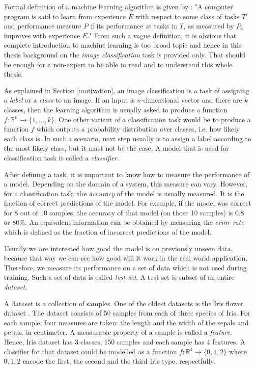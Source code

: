 Formal definition of a machine learning algorithm is given by \cite{Mitchell:1997:ML:541177}: "A computer program is said to learn from experience $E$ with respect to some class of tasks $T$ and performance measure $P$ if its performance at tasks in $T$, as measured by $P$, improves with experience $E$." 
From such a vague definition, it is obvious that complete introduction to machine learning is too broad topic and hence in this thesis background on the \textit{image classification} task is provided only. That should be enough for a non-expert to be able to read and to understand this whole thesis.

As explained in Section \ref{motivation}, an image classification is a task of assigning a \textit{label} or a \textit{class} to an image. If an input is $n$-dimensional vector and there are $k$ classes, then the learning algorithm is usually asked to produce a function $f: \mathbb{R}^n \rightarrow \{1, ... , k\}$. One other variant of a classification task would be to produce a function $f$ which outputs a probability distribution over classes, i.e. how likely each class is. In such a scenario, next step usually is to assign a label according to the most likely class, but it must not be the case. A model that is used for classification task is called a \textit{classifier}.

After defining a task, it is important to know how to measure the performance of a model. Depending on the domain of a system, this measure can vary. However, for a classification task, the \textit{accuracy} of the model is usually measured. It is the fraction of correct predictions of the model. For example, if the model was correct for 8 out of 10 samples, the accuracy of that model (on those 10 samples) is $0.8$ or $80\%$. An equivalent information can be obtained by measuring the \textit{error rate} which is defined as the fraction of incorrect predictions of the model. 

Usually we are interested how good the model is on previously unseen data, because that way we can see how good will it work in the real world application. Therefore, we measure its performance on a set of data which is not used during training. Such a set of data is called \textit{test set}. A test set is subset of an entire \textit{dataset}.

A dataset is a collection of samples. One of the oldest datasets is the Iris flower dataset \cite{iris-dataset}. The dataset consists of 50 samples from each of three species of Iris. For each sample, four measures are taken: the length and the width of the sepals and petals, in centimeter. A measurable property of a sample is called a \textit{feature}. Hence, Iris dataset has 3 classes, 150 samples and each sample has 4 features. A classifier for that dataset could be modelled as a function $f: \mathbb{R}^4 \rightarrow \{0, 1, 2\}$ where $0, 1, 2$  encode the first, the second and the third Iris type, respectfully.

